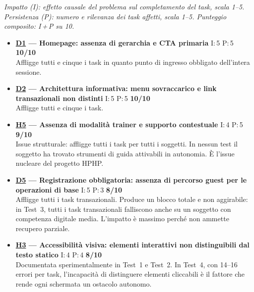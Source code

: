 ﻿\documentclass[11pt,a4paper]{article}
\begin{document}
\noindent\textit{Impatto (I): effetto causale del problema sul completamento 
del task, scala 1--5. Persistenza (P): numero e rilevanza dei task affetti, 
scala 1--5. Punteggio composito: I\,+\,P su 10.}

\begin{tcolorbox}[base]
\begin{itemize}[leftmargin=*,itemsep=8pt]

    \item \textbf{\hyperref[iss:D1]{D1} --- Homepage: assenza di gerarchia 
    e CTA primaria}
    \hfill I:\,5 \textbar{} P:\,5 \textbar{} \textbf{10/10}\\
    Affligge tutti e cinque i task in quanto punto di ingresso obbligato 
    dell'intera sessione. 

    \item \textbf{\hyperref[iss:D2]{D2} --- Architettura informativa:
    menu sovraccarico e link transazionali non distinti}
    \hfill I:\,5 \textbar{} P:\,5 \textbar{} \textbf{10/10}\\
    Affligge tutti e cinque i task.

    \item \textbf{\hyperref[iss:H5]{H5} --- Assenza di modalità trainer 
    e supporto contestuale}
    \hfill I:\,4 \textbar{} P:\,5 \textbar{} \textbf{9/10}\\
    Issue strutturale: affligge tutti i task per tutti i soggetti. 
    In nessun test il soggetto ha trovato strumenti di guida attivabili 
    in autonomia. È l'issue nucleare del 
    progetto HPHP.

    \item \textbf{\hyperref[iss:D5]{D5} --- Registrazione obbligatoria:
    assenza di percorso guest per le operazioni di base}
    \hfill I:\,5 \textbar{} P:\,3 \textbar{} \textbf{8/10}\\
    Affligge tutti i task transazionali. Produce un blocco 
    totale e non aggirabile: in Test~3, tutti i task transazionali 
    falliscono anche su un soggetto con competenza digitale media. 
    L'impatto è massimo perché non ammette recupero parziale.

    \item \textbf{\hyperref[iss:H3]{H3} --- Accessibilità visiva: 
    elementi interattivi non distinguibili dal testo statico}
    \hfill I:\,4 \textbar{} P:\,4 \textbar{} \textbf{8/10}\\
    Documentata sperimentalmente in Test~1 e Test~2. 
    In Test~4, con 14--16 errori per task, l'incapacità di distinguere 
    elementi cliccabili è il fattore che rende ogni schermata un ostacolo 
    autonomo.


\end{itemize}
\end{tcolorbox}
\end{document}
